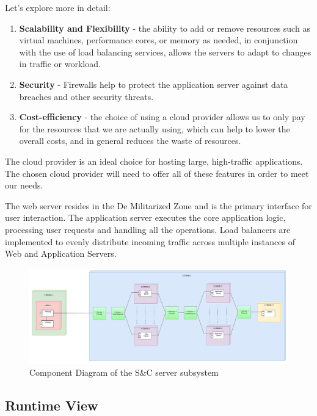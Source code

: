 \documentclass[a4paper,12pt]{article}
\begin{document}
Let's explore more in detail:

\begin{enumerate}
    \item \textbf{Scalability and Flexibility} - the ability to add or remove resources such as virtual machines, performance cores, or memory as needed, in conjunction with the use of load balancing services, allows the servers to adapt to changes in traffic or workload.
    \item \textbf{Security} - Firewalls help to protect the application server against data breaches and other security threats.
    \item \textbf{Cost-efficiency} - the choice of using a cloud provider allows us to only pay for the resources that we are actually using, which can help to lower the overall costs, and in general reduces the waste of resources.
\end{enumerate}

The cloud provider is an ideal choice for hosting large, high-traffic applications. The chosen cloud provider will need to offer all of these features in order to meet our needs.

The web server resides in the De Militarized Zone and is the primary interface for user interaction. The application server executes the core application logic, processing user requests and handling all the operations. Load balancers are implemented to evenly distribute incoming traffic across multiple instances of Web and Application Servers.
\begin{figure}[H]
    \centering
    \includegraphics[scale = 0.33]{DD_figures/SingleDiagrams/DeploymentView.png}
    \caption{Component Diagram of the S\&C server subsystem}
    \centering
\end{figure}


\subsection{Runtime View}
\end{document}

